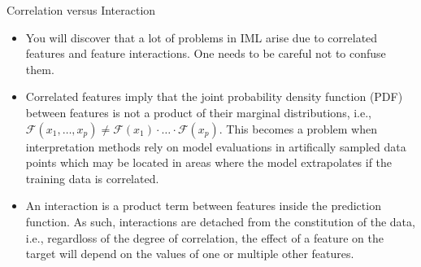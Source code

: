 \documentclass[11pt,compress,t,notes=noshow, xcolor=table]{beamer}
\begin{document}
\begin{vbframe}{Correlation versus Interaction}
\begin{itemize}
\itemsep2em
\item You will discover that a lot of problems in IML arise due to correlated features and feature interactions. One needs to be careful not to confuse them.
\item Correlated features imply that the joint probability density function (PDF) between features is not a product of their marginal distributions, i.e., $\mathcal{F}(x_1, \dots, x_p) \neq \mathcal{F}(x_1) \cdot \dots \cdot \mathcal{F}(x_p)$. This becomes a problem when interpretation methods rely on model evaluations in artifically sampled data points which may be located in areas where the model extrapolates if the training data is correlated.
\item An interaction is a product term between features inside the prediction function. As such, interactions are detached from the constitution of the data, i.e., regardloss of the degree of correlation, the effect of a feature on the target will depend on the values of one or multiple other features.
\end{itemize}
\end{vbframe}
\end{document}
